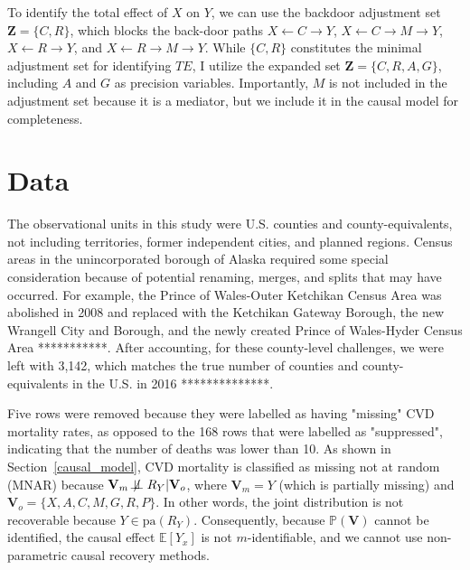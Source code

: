 \documentclass{article}
\theoremstyle{plain}
\theoremstyle{definition}
\theoremstyle{remark}
\begin{document}
To identify the total effect of $X$ on $Y$, we can use the backdoor adjustment set $\mathbf Z= \{C,R\}$, which blocks the back-door paths $X\leftarrow C \rightarrow Y$, $X\leftarrow C \rightarrow M\rightarrow Y$, $X \leftarrow R \rightarrow Y$, and 
$X \leftarrow R \rightarrow M\rightarrow Y$. 
While $\{C,R\}$ constitutes the minimal adjustment set
for identifying $TE$, I utilize the expanded set $\mathbf Z = \{C,R,A,G\}$, including $A$ and $G$ as precision variables. Importantly, $M$ is not included in the adjustment set because it is a mediator, but we include it in the causal model for completeness.




\section{Data}
\label{data}

The observational units in this study were U.S. counties and county-equivalents, not including territories, former independent cities, 
and planned regions. Census areas in the unincorporated
borough of Alaska required some special consideration because of potential renaming, merges, and splits that may have occurred. For example, the  Prince of Wales-Outer Ketchikan Census Area was abolished in
2008 and replaced with the Ketchikan Gateway Borough, the new Wrangell City and Borough, and the newly created Prince of Wales-Hyder Census Area ***********. After accounting, for these county-level challenges, we were left with 3,142, which matches the true number of counties and county-equivalents in the U.S. in 2016 **************. 

Five rows were removed because they were labelled
as having "missing" CVD mortality rates, as opposed to the
168 rows that were labelled as "suppressed", indicating
that the number of deaths was lower than 10.
As shown in Section~\ref{causal_model}, CVD mortality
is classified as missing not at random (MNAR) because $\mathbf V_m \not\!\perp\!\!\!\perp R_Y|\mathbf V_o$,
where $\mathbf V_m=Y$ (which is partially missing) and
$\mathbf V_o = \{X,A,C,M,G,R,P\}$. In other words, the joint distribution is not recoverable because $Y \in \text {pa}(R_Y)$.
Consequently, because $\mathbb P(\mathbf V)$ cannot
be identified, the causal effect $\mathbb E[Y_x]$ is
not $m$-identifiable, and we cannot use non-parametric
causal recovery methods.
\end{document}
